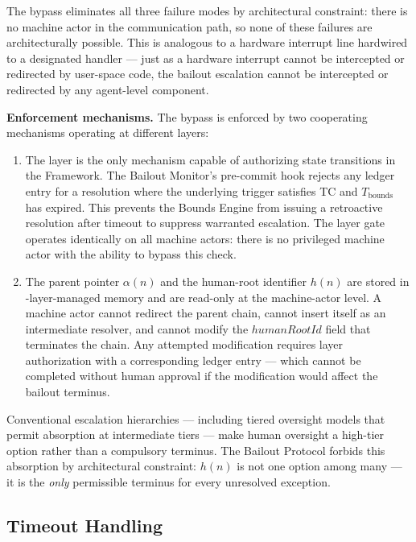 The bypass eliminates all three failure modes by architectural constraint: there is no machine actor in the communication path, so none of these failures are architecturally possible. This is analogous to a hardware interrupt line hardwired to a designated handler — just as a hardware interrupt cannot be intercepted or redirected by user-space code, the bailout escalation cannot be intercepted or redirected by any agent-level component.

\bigskip
\noindent\textbf{Enforcement mechanisms.} The bypass is enforced by two cooperating mechanisms operating at different layers:

\begin{enumerate}
\item[\textbf{Fact Layer gate.}] The \fact{} layer is the only mechanism capable of authorizing state transitions in the \bxthree{} Framework. The Bailout Monitor's pre-commit hook rejects any ledger entry for a resolution where the underlying trigger satisfies TC and $T_{\text{bounds}}$ has expired. This prevents the Bounds Engine from issuing a retroactive resolution after timeout to suppress warranted escalation. The \fact{} layer gate operates identically on all machine actors: there is no privileged machine actor with the ability to bypass this check.

\item[\textbf{Immutable parent-pointer and human-root architecture.}] The parent pointer $\alpha(n)$ and the human-root identifier $h(n)$ are stored in \fact-layer-managed memory and are read-only at the machine-actor level. A machine actor cannot redirect the parent chain, cannot insert itself as an intermediate resolver, and cannot modify the $humanRootId$ field that terminates the chain. Any attempted modification requires \purpose{} layer authorization with a corresponding ledger entry — which cannot be completed without human approval if the modification would affect the bailout terminus.
\end{enumerate}

Conventional escalation hierarchies — including tiered oversight models that permit absorption at intermediate tiers — make human oversight a high-tier option rather than a compulsory terminus. The Bailout Protocol forbids this absorption by architectural constraint: $h(n)$ is not one option among many — it is the \emph{only} permissible terminus for every unresolved exception.

\subsection{Timeout Handling}\label{sec:timeout-handling}


